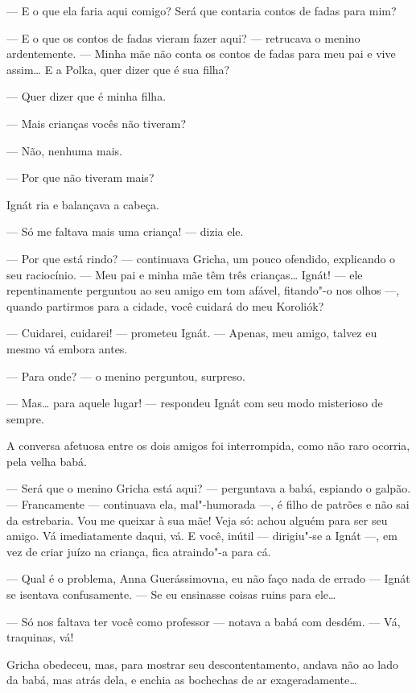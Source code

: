 --- E o que ela faria aqui comigo? Será que contaria contos de fadas
para mim?

--- E o que os contos de fadas vieram fazer aqui? --- retrucava o menino
ardentemente. --- Minha mãe não conta os contos de fadas para meu pai e
vive assim\ldots{} E a Polka, quer dizer que é sua filha?

--- Quer dizer que é minha filha.

--- Mais crianças vocês não tiveram?

--- Não, nenhuma mais.

--- Por que não tiveram mais?

Ignát ria e balançava a cabeça.

--- Só me faltava mais uma criança! --- dizia ele.

--- Por que está rindo? --- continuava Gricha, um pouco ofendido,
explicando o seu raciocínio. --- Meu pai e minha mãe têm três
crianças\ldots{} Ignát! --- ele repentinamente perguntou ao seu amigo em tom
afável, fitando"-o nos olhos ---, quando partirmos para a cidade, você
cuidará do meu Koroliók?

--- Cuidarei, cuidarei! --- prometeu Ignát. --- Apenas, meu amigo,
talvez eu mesmo vá embora antes.

--- Para onde? --- o menino perguntou, surpreso.

--- Mas\ldots{} para aquele lugar! --- respondeu Ignát com seu modo
misterioso de sempre.

A conversa afetuosa entre os dois amigos foi interrompida, como não raro
ocorria, pela velha babá.

--- Será que o menino Gricha está aqui? --- perguntava a babá, espiando o
galpão. --- Francamente --- continuava ela, mal"-humorada ---, é filho de
patrões e não sai da estrebaria. Vou me queixar à sua mãe! Veja só:
achou alguém para ser seu amigo. Vá imediatamente daqui, vá. E você,
inútil --- dirigiu"-se a Ignát ---, em vez de criar juízo na criança,
fica atraindo"-a para cá.

--- Qual é o problema, Anna Guerássimovna, eu não faço nada de errado
--- Ignát se isentava confusamente. --- Se eu ensinasse coisas ruins
para ele\ldots{}

--- Só nos faltava ter você como professor --- notava a babá com desdém.
--- Vá, traquinas, vá!

Gricha obedeceu, mas, para mostrar seu descontentamento, andava não ao
lado da babá, mas atrás dela, e enchia as bochechas de ar
exageradamente\ldots{}

